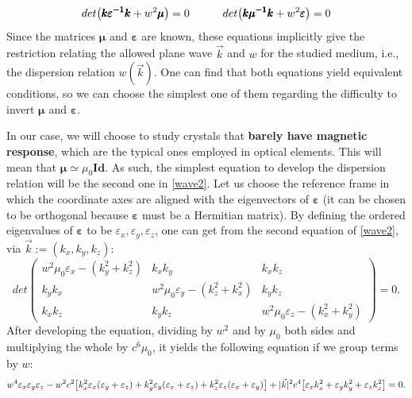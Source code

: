 \documentclass[11pt, a4paper, twoside]{article} %
\begin{document}
\begin{equation}\label{wave2}
det\qty(\pmb{k}\pmb{\varepsilon^{-1}}\pmb{k}+w^2\pmb{\mu})=0 \quad \quad\quad det\qty(\pmb{k}\pmb{\mu^{-1}}\pmb{k}+w^2\pmb{\varepsilon})=0
\end{equation}
Since the matrices $\pmb{\mu}$ and $\pmb{\varepsilon}$ are known, these equations implicitly give the restriction relating the allowed plane wave $\vec{k}$ and $w$ for the studied medium, i.e., the dispersion relation $w(\vec{k})$. One can find that both equations yield equivalent conditions, so we can choose the simplest one of them regarding the difficulty to invert $\pmb{\mu}$ and $\pmb{\varepsilon}$.

In our case, we will choose to study crystals that {\bf barely have magnetic response}, which are the typical ones employed in optical elements. This will mean that $\pmb{\mu}\simeq \mu_0\pmb{Id}$. As such, the simplest equation to develop the dispersion relation will be the second one in \eqref{wave2}. Let us choose the reference frame in which the coordinate axes are aligned with the eigenvectors of $\pmb{\varepsilon}$ (it can be chosen to be orthogonal because $\pmb{\varepsilon}$ must be a Hermitian matrix). By defining the ordered eigenvalues of $\pmb{\varepsilon}$ to be $\varepsilon_x, \varepsilon_y, \varepsilon_z$, one can get from the second equation of \eqref{wave2}, via $\vec{k}:=(k_x,k_y,k_z)$:
\begin{equation}
det\begin{pmatrix}
w^2\mu_0\varepsilon_x-(k_y^2+k_z^2) & k_xk_y & k_xk_z\\
k_yk_x & w^2\mu_0\varepsilon_y-(k_z^2+k_x^2) & k_yk_z\\
k_xk_z & k_yk_z & w^2\mu_0\varepsilon_z-(k_x^2+k_y^2)
\end{pmatrix}=0.
\end{equation}
After developing the equation, dividing by $w^2$ and by $\mu_0$ both sides and multiplying the whole by $c^6\mu_0$, it yields the following equation if we group terms by $w$:
\begin{equation}\label{Fres}
w^4\varepsilon_x\varepsilon_y\varepsilon_z-w^2c^2\qty[k_x^2\varepsilon_x(\varepsilon_y+\varepsilon_z)+k_y^2\varepsilon_y(\varepsilon_x+\varepsilon_z)+k_z^2\varepsilon_z(\varepsilon_x+\varepsilon_y) ]+|\vec{k}|^2c^4\qty[\varepsilon_xk_x^2+\varepsilon_yk_y^2+\varepsilon_zk_z^2]=0.
\end{equation}
\end{document}
